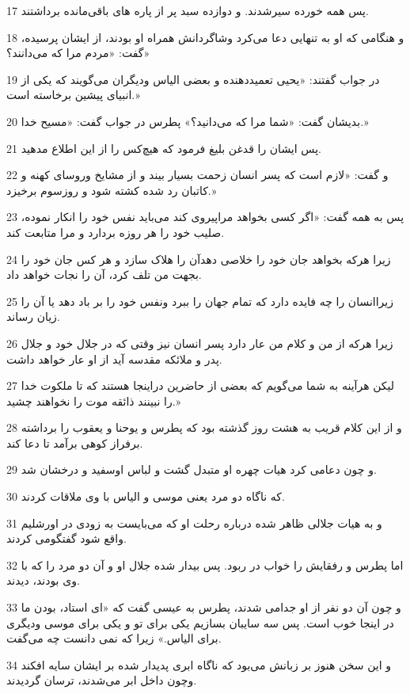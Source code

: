 \par 17 پس همه خورده سیرشدند. و دوازده سبد پر از پاره های باقی‌مانده برداشتند.
\par 18 و هنگامی که او به تنهایی دعا می‌کرد وشاگردانش همراه او بودند، از ایشان پرسیده، گفت: «مردم مرا که می‌دانند؟»
\par 19 در جواب گفتند: «یحیی تعمید‌دهنده و بعضی الیاس ودیگران می‌گویند که یکی از انبیای پیشین برخاسته است.»
\par 20 بدیشان گفت: «شما مرا که می‌دانید؟» پطرس در جواب گفت: «مسیح خدا.»
\par 21 پس ایشان را قدغن بلیغ فرمود که هیچ‌کس را از این اطلاع مدهید.
\par 22 و گفت: «لازم است که پسر انسان زحمت بسیار بیند و از مشایخ وروسای کهنه و کاتبان رد شده کشته شود و روزسوم برخیزد.»
\par 23 پس به همه گفت: «اگر کسی بخواهد مراپیروی کند می‌باید نفس خود را انکار نموده، صلیب خود را هر روزه بردارد و مرا متابعت کند.
\par 24 زیرا هر‌که بخواهد جان خود را خلاصی دهدآن را هلاک سازد و هر کس جان خود را بجهت من تلف کرد، آن را نجات خواهد داد.
\par 25 زیراانسان را چه فایده دارد که تمام جهان را ببرد ونفس خود را بر باد دهد یا آن را زیان رساند.
\par 26 زیرا هر‌که از من و کلام من عار دارد پسر انسان نیز وقتی که در جلال خود و جلال پدر و ملائکه مقدسه آید از او عار خواهد داشت.
\par 27 لیکن هرآینه به شما می‌گویم که بعضی از حاضرین دراینجا هستند که تا ملکوت خدا را نبینند ذائقه موت را نخواهند چشید.»
\par 28 و از این کلام قریب به هشت روز گذشته بود که پطرس و یوحنا و یعقوب را برداشته برفراز کوهی برآمد تا دعا کند.
\par 29 و چون دعامی کرد هیات چهره او متبدل گشت و لباس اوسفید و درخشان شد.
\par 30 که ناگاه دو مرد یعنی موسی و الیاس با وی ملاقات کردند.
\par 31 و به هیات جلالی ظاهر شده درباره رحلت او که می‌بایست به زودی در اورشلیم واقع شود گفتگومی کردند.
\par 32 اما پطرس و رفقایش را خواب در ربود. پس بیدار شده جلال او و آن دو مرد را که با وی بودند، دیدند.
\par 33 و چون آن دو نفر از او جدامی شدند، پطرس به عیسی گفت که «ای استاد، بودن ما در اینجا خوب است. پس سه سایبان بسازیم یکی برای تو و یکی برای موسی ودیگری برای الیاس.» زیرا که نمی دانست چه می‌گفت.
\par 34 و این سخن هنوز بر زبانش می‌بود که ناگاه ابری پدیدار شده بر ایشان سایه افکند وچون داخل ابر می‌شدند، ترسان گردیدند.
